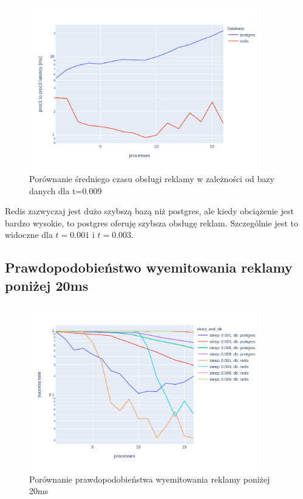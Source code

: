 \documentclass[10pt]{article}
\begin{document}
\begin{figure}[H]
    \centering
    \includegraphics[width=0.9\textwidth]{./graphs/diff_in_end_postgres_vs_redis0009.png}
    \caption{Porównanie średniego czasu obsługi reklamy w zależności od bazy danych dla t=0.009}
\end{figure}

Redis zazwyczaj jest dużo szybszą bazą niż postgres, ale kiedy obciążenie jest bardzo wysokie, to postgres oferuję szybsza obsługę reklam. Szczególnie jest to widoczne dla $t=0.001$ i $t=0.003$.


\subsection*{Prawdopodobieństwo wyemitowania reklamy poniżej 20ms}

\begin{figure}[H]
    \centering
    \includegraphics[width=0.9\textwidth]{./graphs/success_rate_all_sleeps.png}
    \caption{Porównanie prawdopodobieństwa wyemitowania reklamy poniżej 20ms}
\end{figure}
\end{document}
